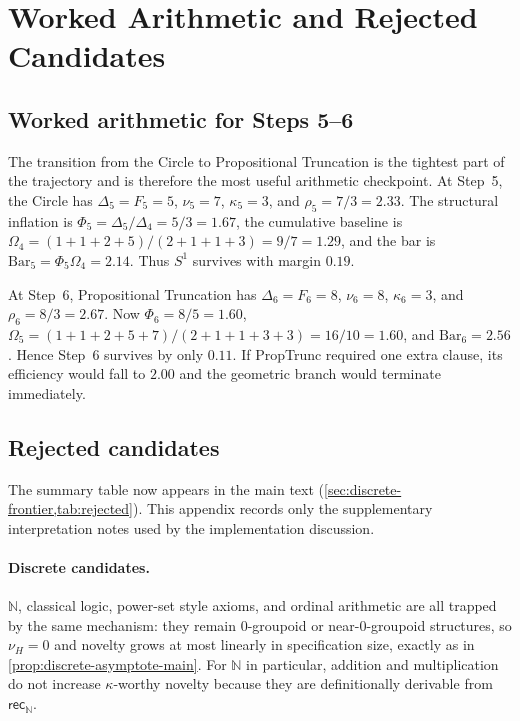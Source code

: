 \documentclass[11pt,a4paper]{article}
\theoremstyle{plain}
\theoremstyle{definition}
\theoremstyle{remark}
\newcommand{\N}{\mathbb{N}}
\begin{document}
\section{Worked Arithmetic and Rejected Candidates}
\label{app:rejections}

\subsection{Worked arithmetic for Steps 5--6}
\label{app:worked-arithmetic}

The transition from the Circle to Propositional Truncation is the tightest part of the trajectory and is therefore the most useful arithmetic checkpoint.
At Step~5, the Circle has $\Delta_5=F_5=5$, $\nu_5=7$, $\kappa_5=3$, and $\rho_5=7/3=2.33$.
The structural inflation is $\Phi_5=\Delta_5/\Delta_4=5/3=1.67$, the cumulative baseline is $\Omega_4=(1+1+2+5)/(2+1+1+3)=9/7=1.29$, and the bar is $\mathrm{Bar}_5=\Phi_5\Omega_4=2.14$.
Thus $S^1$ survives with margin $0.19$.

At Step~6, Propositional Truncation has $\Delta_6=F_6=8$, $\nu_6=8$, $\kappa_6=3$, and $\rho_6=8/3=2.67$.
Now $\Phi_6=8/5=1.60$, $\Omega_5=(1+1+2+5+7)/(2+1+1+3+3)=16/10=1.60$, and $\mathrm{Bar}_6=2.56$.
Hence Step~6 survives by only $0.11$.
If PropTrunc required one extra clause, its efficiency would fall to $2.00$ and the geometric branch would terminate immediately.

\subsection{Rejected candidates}

The summary table now appears in the main text (\cref{sec:discrete-frontier,tab:rejected}).
This appendix records only the supplementary interpretation notes used by the implementation discussion.

\paragraph{Discrete candidates.}
$\N$, classical logic, power-set style axioms, and ordinal arithmetic are all trapped by the same mechanism: they remain 0-groupoid or near-0-groupoid structures, so $\nu_H=0$ and novelty grows at most linearly in specification size, exactly as in \cref{prop:discrete-asymptote-main}.
For $\N$ in particular, addition and multiplication do not increase $\kappa$-worthy novelty because they are definitionally derivable from $\mathsf{rec}_\N$.
\end{document}
